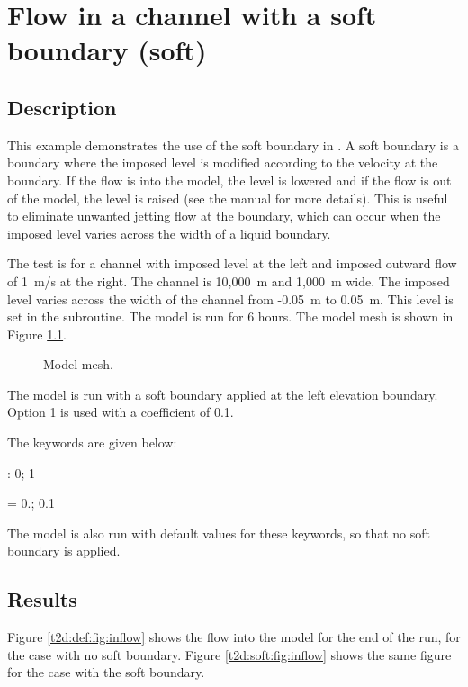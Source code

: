 \chapter{Flow in a channel with a soft boundary (soft)}

\section{Description}

This example demonstrates the use of the soft boundary in .
A soft boundary is a boundary where the imposed level is modified according to
the velocity at the boundary.
If the flow is into the model, the level is lowered and if the flow is out of
the model, the level is raised (see the manual for more details).
This is useful to eliminate unwanted jetting flow at the boundary, which can
occur when the imposed level varies across the width of a liquid boundary.

The test is for a channel with imposed level at the left and imposed outward
flow of 1~m/s at the right.
The channel is 10,000~m and 1,000~m wide.
The imposed level varies across the width of the channel from -0.05~m to 0.05~m.
This level is set in the  subroutine.
The model is run for 6 hours.
The model mesh is shown in Figure \ref{t2d:soft:fig:mesh}.

\begin{figure}[H]
 \centering
 \caption{Model mesh.}
 \label{t2d:soft:fig:mesh}
\end{figure}

The model is run with a soft boundary applied at the left elevation boundary.
Option 1 is used with a coefficient of 0.1.

The keywords are given below:

 : 0; 1

 = 0.; 0.1

The model is also run with default values for these keywords, so that no soft
boundary is applied.

\section{Results}

Figure \ref{t2d:def:fig:inflow} shows the flow into the model for the end of the
run, for the case with no soft boundary.
Figure \ref{t2d:soft:fig:inflow} shows the same figure for the case with the
soft boundary.

